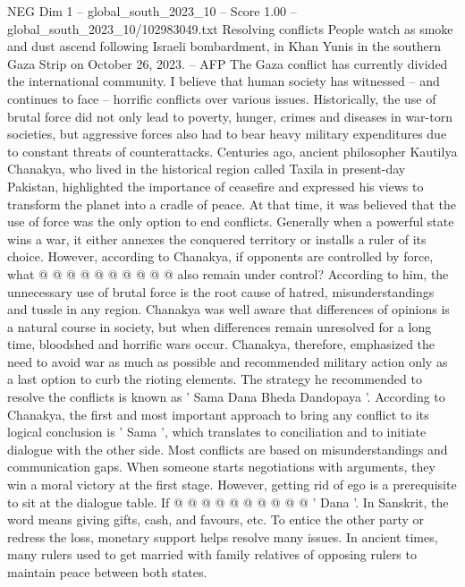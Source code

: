 \begin{textsample}{NEG Dim 1 – global\_south\_2023\_10 – Score 1.00 – global\_south\_2023\_10/102983049.txt}  \label{ex:f1_neg_402}
Resolving conflicts People watch as smoke and dust ascend following Israeli bombardment, in Khan Yunis in the southern Gaza Strip on October 26, 2023. -- AFP The Gaza conflict has currently divided the international community.
I believe that human society has witnessed -- and continues to face -- horrific conflicts over various issues.
Historically, the use of brutal force did not only lead to poverty, hunger, crimes and diseases in war-torn societies, but aggressive forces also had to bear heavy military expenditures due to constant threats of counterattacks.
Centuries ago, ancient philosopher Kautilya Chanakya, who lived in the historical region called Taxila in present-day Pakistan, highlighted the importance of ceasefire and expressed his views to transform the planet into a cradle of peace.
At that time, it was believed that the use of force was the only option to end conflicts.
Generally when a powerful state wins a war, it either annexes the conquered territory or installs a ruler of its choice.
However, according to Chanakya, if opponents are controlled by force, what @ @ @ @ @ @ @ @ @ @ also remain under control?
According to him, the unnecessary use of brutal force is the root cause of hatred, misunderstandings and tussle in any region.
Chanakya was well aware that differences of opinions is a natural course in society, but when differences remain unresolved for a long time, bloodshed and horrific wars occur.
Chanakya, therefore, emphasized the need to avoid war as much as possible and recommended military action only as a last option to curb the rioting elements.
The strategy he recommended to resolve the conflicts is known as ' Sama Dana Bheda Dandopaya '.
According to Chanakya, the first and most important approach to bring any conflict to its logical conclusion is ' Sama ', which translates to conciliation and to initiate dialogue with the other side.
Most conflicts are based on misunderstandings and communication gaps.
When someone starts negotiations with arguments, they win a moral victory at the first stage.
However, getting rid of ego is a prerequisite to sit at the dialogue table.
If @ @ @ @ @ @ @ @ @ @ ' Dana '.
In Sanskrit, the word means giving gifts, cash, and favours, etc.
To entice the other party or redress the loss, monetary support helps resolve many issues.
In ancient times, many rulers used to get married with family relatives of opposing rulers to maintain peace between both states.

\end{textsample}
